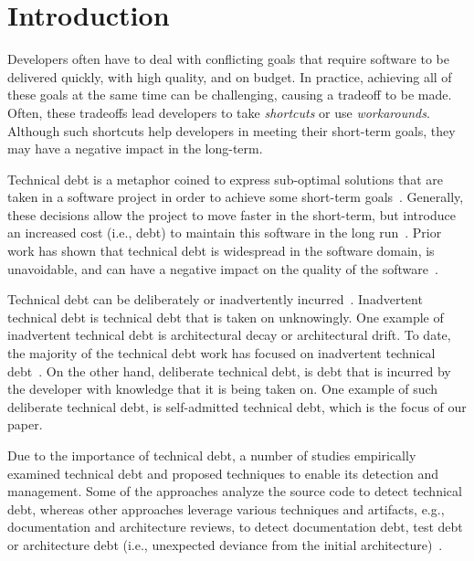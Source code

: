 \section{Introduction}
\label{chap4:sec:introduction}

Developers often have to deal with conflicting goals that require software to be delivered quickly, with high quality, and on budget. In practice, achieving all of these goals at the same time can be challenging, causing a tradeoff to be made. Often, these tradeoffs lead developers to take \emph{shortcuts} or use \emph{workarounds}. Although such shortcuts help developers in meeting their short-term goals, they may have a negative impact in the long-term.

Technical debt is a metaphor coined to express sub-optimal solutions that are taken in a software project in order to achieve some short-term goals~\cite{Cunningham1992WPM}. Generally, these decisions allow the project to move faster in the short-term, but introduce an increased cost (i.e., debt) to maintain this software in the long run~\cite{Seaman2011,Kruchten2013IWMTD}.  Prior work has shown that technical debt is widespread in the software domain, is unavoidable, and can have a negative impact on the quality of the software~\cite{Lim2012Software}. 

Technical debt can be deliberately or inadvertently incurred~\cite{MartinFowler:TechnicalDebtQuadrant}. Inadvertent technical debt is technical debt that is taken on unknowingly. One example of inadvertent technical debt is architectural decay or architectural drift. To date, the majority of the technical debt work has focused on inadvertent technical debt~\cite{Nord2012WICSA}. On the other hand, deliberate technical debt, is debt that is incurred by the developer with knowledge that it is being taken on. One example of such deliberate technical debt, is self-admitted technical debt, which is the focus of our paper.

Due to the importance of technical debt, a number of studies empirically examined technical debt and proposed techniques to enable its detection and management. Some of the approaches analyze the source code to detect technical debt, whereas other approaches leverage various techniques and artifacts, e.g., documentation and architecture reviews, to detect documentation debt, test debt or architecture debt (i.e., unexpected deviance from the initial architecture)~\cite{Alves2016IST,Xiao2016ICSE}.

